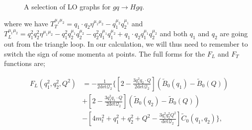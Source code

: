 \begin{figure}[t]
\caption{A selection of LO graphs for $gq \to Hgq$.}
\label{fig:qgh_lo}
\end{figure}

where we have $ T_T^{\mu_1 \mu_2} = q_1 \cdot q_2 \eta^{\mu_1 \mu_2} - q_1^{\mu_2} q_2^{\mu_1} $ and $T_L^{\mu_1 \mu_2} = q_1^2 q_2^2 \eta^{\mu_1 \mu_2} - q_1^2 q_2^{\mu_1} q_2^{\mu_2} - q_2^2 q_1^{\mu_1} q_1^{\mu_2} + q_1 \cdot q_2 q_1^{\mu_1} q_2^{\mu_2}$ and both $q_1$ and $q_2$ are going out from the triangle loop. In our calculation, we will thus need to remember to switch the sign of some momenta at points. The full forms for the $F_L$ and $F_T$ functions are;

\begin{equation}
\begin{split}
F_L(q_1^2,q_2^2,Q^2) &= -\frac{1}{2 \text{det} \mathcal{Q}_2} \bigg \{ \left[2-\frac{3 q_1^2 q_2 \cdot Q}{2 \text{det}\mathcal{Q}_2} \right] \left(\tilde{B}_0(q_1)-\tilde{B}_0(Q) \right)\\
&+ \left[2-\frac{3 q_2^2 q_1 \cdot Q}{2 \text{det}\mathcal{Q}_2} \right] \left(\tilde{B}_0(q_2)-\tilde{B}_0(Q) \right) \\
&- \left[4m_t^2 + q_1^2 + q_2^2 + Q^2 - \frac{3 q_1^2 q_2^2 Q^2}{\text{det}\mathcal{Q}_2} \right] \tilde{C}_0(q_1,q_2) \bigg \},
\end{split}
\end{equation}

